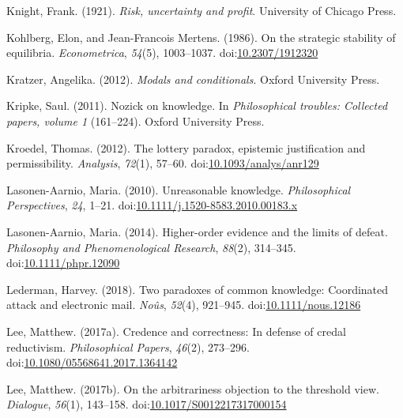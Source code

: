 \documentclass[
  10pt,
  letterpaper,
  twoside]{scrbook}
\newlength{\cslhangindent}
\newenvironment{CSLReferences}[2] %
 {\begin{list}{}{%
  \setlength{\itemindent}{0pt}
  \setlength{\leftmargin}{0pt}
  \setlength{\parsep}{0pt}
  \ifodd #1
   \setlength{\leftmargin}{\cslhangindent}
   \setlength{\itemindent}{-1\cslhangindent}
  \fi
  \setlength{\itemsep}{#2\baselineskip}}}
 {\end{list}}
\begin{document}
\begin{CSLReferences}{1}{0}
Knight, Frank. (1921). \emph{Risk, uncertainty and profit}. University
of Chicago Press.

Kohlberg, Elon, and Jean-Francois Mertens. (1986). On the strategic
stability of equilibria. \emph{Econometrica}, \emph{54}(5), 1003--1037.
doi:\href{https://doi.org/10.2307/1912320}{10.2307/1912320}

Kratzer, Angelika. (2012). \emph{Modals and conditionals}. Oxford
University Press.

Kripke, Saul. (2011). Nozick on knowledge. In \emph{Philosophical
troubles: Collected papers, volume 1} (161--224). {O}xford {U}niversity
{P}ress.

Kroedel, Thomas. (2012). The lottery paradox, epistemic justification
and permissibility. \emph{Analysis}, \emph{72}(1), 57--60.
doi:\href{https://doi.org/10.1093/analys/anr129}{10.1093/analys/anr129}

Lasonen-Aarnio, Maria. (2010). Unreasonable knowledge.
\emph{Philosophical Perspectives}, \emph{24}, 1--21.
doi:\href{https://doi.org/10.1111/j.1520-8583.2010.00183.x}{10.1111/j.1520-8583.2010.00183.x}

Lasonen-Aarnio, Maria. (2014). Higher-order evidence and the limits of
defeat. \emph{Philosophy and Phenomenological Research}, \emph{88}(2),
314--345.
doi:\href{https://doi.org/10.1111/phpr.12090}{10.1111/phpr.12090}

Lederman, Harvey. (2018). Two paradoxes of common knowledge: Coordinated
attack and electronic mail. \emph{No{û}s}, \emph{52}(4), 921--945.
doi:\href{https://doi.org/10.1111/nous.12186}{10.1111/nous.12186}

Lee, Matthew. (2017a). Credence and correctness: In defense of credal
reductivism. \emph{Philosophical Papers}, \emph{46}(2), 273--296.
doi:\href{https://doi.org/10.1080/05568641.2017.1364142}{10.1080/05568641.2017.1364142}

Lee, Matthew. (2017b). On the arbitrariness objection to the threshold
view. \emph{Dialogue}, \emph{56}(1), 143--158.
doi:\href{https://doi.org/10.1017/S0012217317000154}{10.1017/S0012217317000154}


\end{CSLReferences}
\end{document}
